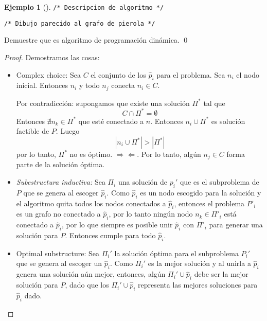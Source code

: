 \documentclass[english, spanish, fleqn, 10pt]{article}
\newcommand{\comentarioc}[1]{\texttt{\textcolor{webred}{/* #1 */}}}
\numberwithin{equation}{section}
\newcommand{\nabsoluto}[1]{\left| #1 \right|}
\theoremstyle{definition}
\newtheorem{beforeExample}{Ejemplo}[section]
\newenvironment{ejemplo}[1][]{\begin{beforeExample}[#1]\renewcommand{\qedsymbol}{$\blacksquare$}}{\qed\end{beforeExample}}
\begin{document}
\begin{ejemplo}
        \comentarioc{Descripcion de algoritmo}
        \begin{center}
                \comentarioc{Dibujo parecido al grafo de pierola}
        \end{center}
        Demuestre que es algoritmo de programación dinámica.
\end{ejemplo}
\begin{proof}
        Demostramos las cosas:
        \begin{itemize}
                \item Complex choice: Sea $C$ el conjunto de los $\hat p _i$ para el problema. Sea $n_i$ el nodo inicial. Entonces $n_i$ y todo $n_j$  conecta $n_i\in C$.

                Por contradicción: supongamos que existe una solución $\Pi^*$ tal que
                \begin{equation*}
                C\cap \Pi^* = \emptyset
                \end{equation*}
                Entonces $\nexists n_k \in \Pi ^* $ que esté conectado a $n$. Entonces $n_i\cup \Pi ^*$ es solución factible de $P$. Luego
                \begin{equation*}
                \nabsoluto{n_i\cup \Pi^*} > \nabsoluto{\Pi ^*}
                \end{equation*}
                por lo tanto, $\Pi ^*$ no es óptimo. $\Rightarrow\Leftarrow$. Por lo tanto, algún $n_j\in C$ forma parte de la solución óptima.

                \item \emph{Subestructura inductiva:} Sea $\Pi_i$ una solución de $p_i'$ que es el subproblema de $P$ que se genera al escoger $\hat p_i$. Como $\hat p_i$ es un nodo escogido para la solución y el algoritmo quita todos los nodos conectados a $\hat p_i$, entonces el problema $P'_i$  es un grafo no conectado a $\hat p_i$, por lo tanto ningún nodo $n_k\in \Pi'_i$ está conectado a $\hat p_i$, por lo que siempre es posible unir $\hat p_i$ con $\Pi'_i$ para generar una solución para $P$. Entonces cumple para todo $\hat p_i$.

                \item Optimal substructure: Sea $\Pi_i'$ la solución óptima para el subproblema $P_i'$ que se genera al escoger un $\hat p_i$. Como $\Pi_i'$ es la mejor solución y al unirla a $\hat p_i$ genera una solución aún mejor, entonces, algún $\Pi_i'\cup \hat p_i$ debe ser la mejor solución para $P$, dado que los $\Pi_i'\cup \hat p_i$ representa las mejores soluciones para $\hat p_i$ dado.
        \end{itemize}
\end{proof}
\end{document}

